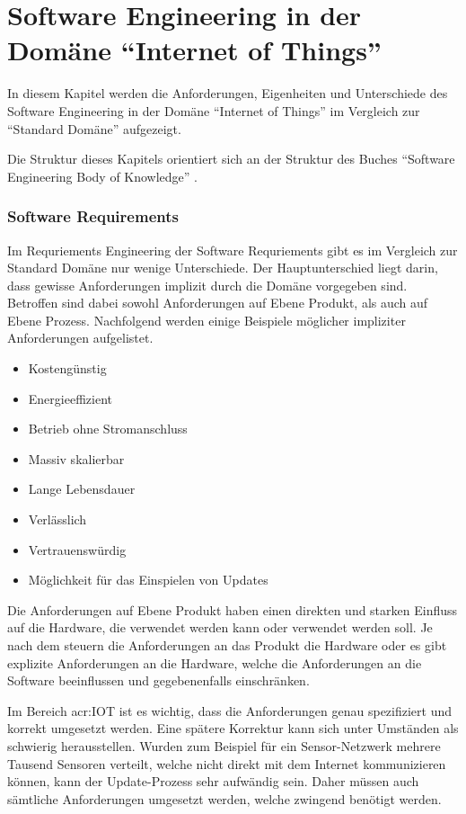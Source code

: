 \chapter{Software Engineering in der Domäne "`Internet of Things"'} \label{chap:sweInIot}
In diesem Kapitel werden die Anforderungen, Eigenheiten und Unterschiede des Software Engineering in der Domäne "`Internet of Things"' im Vergleich zur "`Standard Domäne"' aufgezeigt.

Die Struktur dieses Kapitels orientiert sich an der Struktur des Buches "`Software Engineering Body of Knowledge"' \cite{B:IEEE:SWEBOOK}.



\subsection{Software Requirements}
Im Requriements Engineering der Software Requriements gibt es im Vergleich zur Standard Domäne nur wenige Unterschiede. Der Hauptunterschied liegt darin, dass gewisse Anforderungen implizit durch die Domäne vorgegeben sind. Betroffen sind dabei sowohl Anforderungen auf Ebene Produkt, als auch auf Ebene Prozess. Nachfolgend werden einige Beispiele möglicher impliziter Anforderungen aufgelistet.

\begin{itemize}
\item Kostengünstig
\item Energieeffizient
\item Betrieb ohne Stromanschluss
\item Massiv skalierbar
\item Lange Lebensdauer
\item Verlässlich
\item Vertrauenswürdig
\item Möglichkeit für das Einspielen von Updates
\end{itemize}

Die Anforderungen auf Ebene Produkt haben einen direkten und starken Einfluss auf die Hardware, die verwendet werden kann oder verwendet werden soll. Je nach dem steuern die Anforderungen an das Produkt die Hardware oder es gibt explizite Anforderungen an die Hardware, welche die Anforderungen an die Software beeinflussen und gegebenenfalls einschränken. 

Im Bereich \gls{acr:IOT} ist es wichtig, dass die Anforderungen genau spezifiziert und korrekt umgesetzt werden. Eine spätere Korrektur kann sich unter Umständen als schwierig herausstellen. Wurden zum Beispiel für ein Sensor-Netzwerk mehrere Tausend Sensoren verteilt, welche nicht direkt mit dem Internet kommunizieren können, kann der Update-Prozess sehr aufwändig sein. Daher müssen auch sämtliche Anforderungen umgesetzt werden, welche zwingend benötigt werden.

